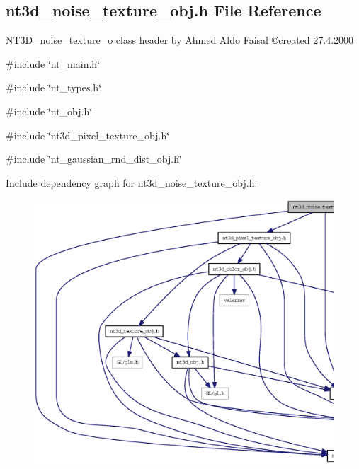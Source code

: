 \subsection{nt3d\_\-noise\_\-texture\_\-obj.h File Reference}
\label{nt3d__noise__texture__obj_8h}



\begin{DoxyItemize}
\item \hyperlink{class_n_t3_d__noise__texture__o}{NT3D\_\-noise\_\-texture\_\-o} class header by Ahmed Aldo Faisal \copyright created 27.4.2000 
\end{DoxyItemize} 


{\ttfamily \#include \char`\"{}nt\_\-main.h\char`\"{}}\par
{\ttfamily \#include \char`\"{}nt\_\-types.h\char`\"{}}\par
{\ttfamily \#include \char`\"{}nt\_\-obj.h\char`\"{}}\par
{\ttfamily \#include \char`\"{}nt3d\_\-pixel\_\-texture\_\-obj.h\char`\"{}}\par
{\ttfamily \#include \char`\"{}nt\_\-gaussian\_\-rnd\_\-dist\_\-obj.h\char`\"{}}\par
Include dependency graph for nt3d\_\-noise\_\-texture\_\-obj.h:
\nopagebreak
\begin{figure}[H]
\begin{center}
\leavevmode
\includegraphics[width=400pt]{nt3d__noise__texture__obj_8h__incl}
\end{center}
\end{figure}

